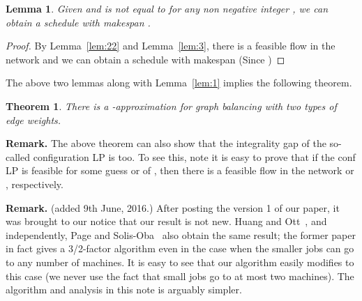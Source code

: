 \documentclass[11pt]{article}
\newtheorem{theorem}{Theorem}
\newtheorem{lemma}{Lemma}
\begin{document}
\begin{lemma}\label{lem:42}
	Given  and is not equal to  for any non negative integer , we can obtain a schedule with makespan .
\end{lemma}
\begin{proof}
By Lemma~\ref{lem:22} and Lemma~\ref{lem:3}, there is a feasible flow in the network  and we can obtain a schedule with makespan  (Since )
\end{proof}
The above two lemmas along with Lemma~\ref{lem:1} implies the following theorem.
\begin{theorem}\label{thm:main}
	There is a -approximation for graph balancing with two types of edge weights.
\end{theorem}
\iffalse
\begin{proof}
	One first checks if  or  has a feasible flow; if not, by Lemma~\ref{lem:21} and~\ref{lem:22} we are guaranteed , and by Lemma~\ref{lem:1} we have a -approximation algorithm.
	By binary search, we find the smallest integer  for which  has a feasible flow. Set  if  is feasible, else . Note that  is not feasible, otherwise  would be feasible by sending an extra  flow of each big job along a path to a machine where this job is assigned by Lemma~\ref{lem:3} contradicting the minimality of . Get orientations as described by Lemma~\ref{lem:3} with respect to both  and , and output the orientation with  minimum makespan.
	If  -- by Lemma~\ref{lem:21} . So by Lemma~\ref{lem:41}, we get an orientation with all weighted in-degrees at most .  
	Otherwise  -- by Lemma~\ref{lem:22} . So by Lemma~\ref{lem:42}, we get an orientation with all weighted in-degrees at most .
\end{proof}
\fi

\noindent
{\bf Remark.} The above theorem can also show that the integrality gap of the so-called configuration LP is  too. To see this, note it is easy to prove that if the conf LP is feasible for some guess  or  of , 
then there is a feasible flow in the network  or , respectively.\smallskip

\noindent
{\bf Remark.}  (added 9th June, 2016.) After posting the version 1 of our paper, it was brought to our notice that our result is not new. Huang and Ott~\cite{HO15}, and independently, Page and Solis-Oba~\cite{PS16} also obtain the same result; the former paper in fact gives a 3/2-factor algorithm even in the case when the smaller jobs can go to any number of machines. It is easy to see that our algorithm easily modifies to this case (we never use the fact that small jobs go to at most two machines). The algorithm and analysis in this note is arguably simpler.





\end{document}

